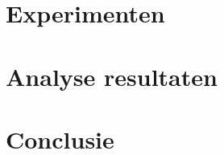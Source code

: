 \documentclass{hogent-article}
\begin{document}
\lipsum[10-12]

\section{Experimenten}

\lipsum[14-18]

\section{Analyse resultaten}

\lipsum[18-21]

\section{Conclusie}

\lipsum[22-23]


\printbibliography[heading=bibintoc]
\end{document}
